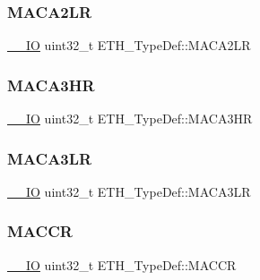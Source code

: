 \mbox{\label{struct_e_t_h___type_def_ae9332525bb7ec86518eecf7153caef19}} 
\subsubsection{\texorpdfstring{MACA2LR}{MACA2LR}}
{\footnotesize\ttfamily \mbox{\hyperlink{group___c_m_s_i_s___c_m3__core__definitions_gaec43007d9998a0a0e01faede4133d6be}{\+\_\+\+\_\+\+IO}} uint32\+\_\+t E\+T\+H\+\_\+\+Type\+Def\+::\+M\+A\+C\+A2\+LR}

\mbox{\label{struct_e_t_h___type_def_ad4dd976fada7085d87aa017f160e70d4}} 
\subsubsection{\texorpdfstring{MACA3HR}{MACA3HR}}
{\footnotesize\ttfamily \mbox{\hyperlink{group___c_m_s_i_s___c_m3__core__definitions_gaec43007d9998a0a0e01faede4133d6be}{\+\_\+\+\_\+\+IO}} uint32\+\_\+t E\+T\+H\+\_\+\+Type\+Def\+::\+M\+A\+C\+A3\+HR}

\mbox{\label{struct_e_t_h___type_def_af31f33c1487ae0ee89ac427d9f0f037d}} 
\subsubsection{\texorpdfstring{MACA3LR}{MACA3LR}}
{\footnotesize\ttfamily \mbox{\hyperlink{group___c_m_s_i_s___c_m3__core__definitions_gaec43007d9998a0a0e01faede4133d6be}{\+\_\+\+\_\+\+IO}} uint32\+\_\+t E\+T\+H\+\_\+\+Type\+Def\+::\+M\+A\+C\+A3\+LR}

\mbox{\label{struct_e_t_h___type_def_a68d7e7c68b5b8adcf7b2b96bc1eea7d9}} 
\subsubsection{\texorpdfstring{MACCR}{MACCR}}
{\footnotesize\ttfamily \mbox{\hyperlink{group___c_m_s_i_s___c_m3__core__definitions_gaec43007d9998a0a0e01faede4133d6be}{\+\_\+\+\_\+\+IO}} uint32\+\_\+t E\+T\+H\+\_\+\+Type\+Def\+::\+M\+A\+C\+CR}

